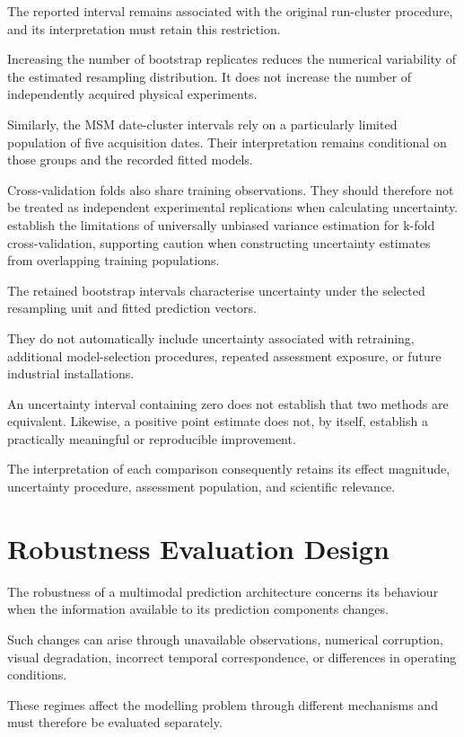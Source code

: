 The reported interval remains associated with the original run-cluster procedure, and its interpretation must retain this restriction.

Increasing the number of bootstrap replicates reduces the numerical variability of the estimated resampling distribution. It does not increase the number of independently acquired physical experiments.

Similarly, the MSM date-cluster intervals rely on a particularly limited population of five acquisition dates. Their interpretation remains conditional on those groups and the recorded fitted models.

Cross-validation folds also share training observations. They should therefore not be treated as independent experimental replications when calculating uncertainty. \textcite{Bengio2004CVVariance} establish the limitations of universally unbiased variance estimation for k-fold cross-validation, supporting caution when constructing uncertainty estimates from overlapping training populations.

The retained bootstrap intervals characterise uncertainty under the selected resampling unit and fitted prediction vectors.

They do not automatically include uncertainty associated with retraining, additional model-selection procedures, repeated assessment exposure, or future industrial installations.

An uncertainty interval containing zero does not establish that two methods are equivalent. Likewise, a positive point estimate does not, by itself, establish a practically meaningful or reproducible improvement.

The interpretation of each comparison consequently retains its effect magnitude, uncertainty procedure, assessment population, and scientific relevance.

\section{Robustness Evaluation Design}
\label{sec:ch4-robustness}

The robustness of a multimodal prediction architecture concerns its behaviour when the information available to its prediction components changes.

Such changes can arise through unavailable observations, numerical corruption, visual degradation, incorrect temporal correspondence, or differences in operating conditions.

These regimes affect the modelling problem through different mechanisms and must therefore be evaluated separately.

